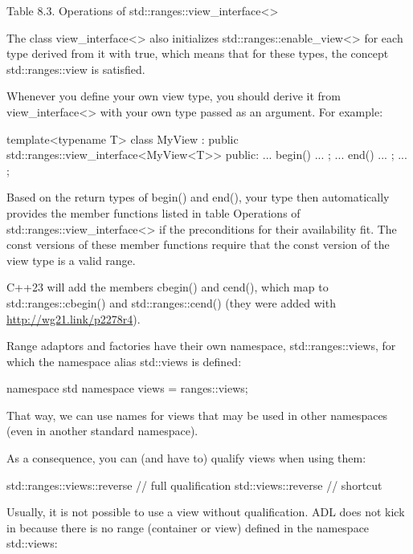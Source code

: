 \begin{center}
Table 8.3. Operations of std::ranges::view\_interface<>
\end{center}

The class view\_interface<> also initializes std::ranges::enable\_view<> for each type derived from it with true, which means that for these types, the concept std::ranges::view is satisfied.

Whenever you define your own view type, you should derive it from view\_interface<> with your own type passed as an argument. For example:

\begin{cpp}
template<typename T>
class MyView : public std::ranges::view_interface<MyView<T>> {
	public:
	... begin() ... ;
	... end() ... ;
	...
};
\end{cpp}

Based on the return types of begin() and end(), your type then automatically provides the member functions listed in table Operations of std::ranges::view\_interface<> if the preconditions for their availability fit. The const versions of these member functions require that the const version of the view type is a valid range.

C++23 will add the members cbegin() and cend(), which map to std::ranges::cbegin() and std::ranges::cend() (they were added with \url{http://wg21.link/p2278r4}).


Range adaptors and factories have their own namespace, std::ranges::views, for which the namespace alias std::views is defined:

\begin{cpp}
namespace std {
	namespace views = ranges::views;
}
\end{cpp}

That way, we can use names for views that may be used in other namespaces (even in another standard namespace).

As a consequence, you can (and have to) qualify views when using them:

\begin{cpp}
std::ranges::views::reverse // full qualification
std::views::reverse // shortcut
\end{cpp}

Usually, it is not possible to use a view without qualification. ADL does not kick in because there is no range (container or view) defined in the namespace std::views:

